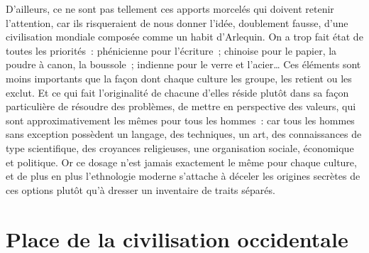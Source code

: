 \documentclass[french,twoside]{book} %
\begin{document}
D’ailleurs, ce ne sont pas tellement ces apports morcelés qui doivent retenir l’attention, car ils risqueraient de nous donner l’idée, doublement fausse, d’une civilisation mondiale composée comme un habit d’Arlequin. On a trop fait état de toutes les priorités : phénicienne pour l’écriture ; chinoise pour le papier, la poudre à canon, la boussole ; indienne pour le verre et l’acier… Ces éléments sont moins importants que la façon dont chaque culture les groupe, les retient ou les exclut. Et ce qui fait l’originalité de chacune d’elles réside plutôt dans sa façon particulière de résoudre des problèmes, de mettre en perspective des valeurs, qui sont approximativement les mêmes pour tous les hommes : car tous les hommes sans exception possèdent un langage, des techniques, un art, des connaissances de type scientifique, des croyances religieuses, une organisation sociale, économique et politique. Or ce dosage n’est jamais exactement le même pour chaque culture, et de plus en plus l’ethnologie moderne s’attache à déceler les origines secrètes de ces options plutôt qu’à dresser un inventaire de traits séparés.

\section[{Place de la civilisation occidentale}]{Place de la civilisation occidentale}
\renewcommand{\leftmark}{Place de la civilisation occidentale}
\end{document}

